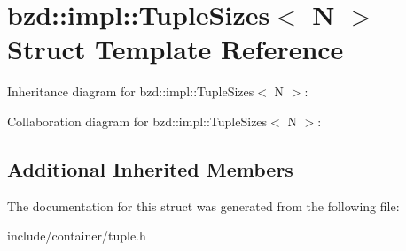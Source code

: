\hypertarget{structbzd_1_1impl_1_1TupleSizes}{}\section{bzd\+:\+:impl\+:\+:Tuple\+Sizes$<$ N $>$ Struct Template Reference}
\label{structbzd_1_1impl_1_1TupleSizes}


Inheritance diagram for bzd\+:\+:impl\+:\+:Tuple\+Sizes$<$ N $>$\+:


Collaboration diagram for bzd\+:\+:impl\+:\+:Tuple\+Sizes$<$ N $>$\+:
\subsection*{Additional Inherited Members}


The documentation for this struct was generated from the following file\+:\begin{DoxyCompactItemize}
\item 
include/container/tuple.\+h\end{DoxyCompactItemize}
